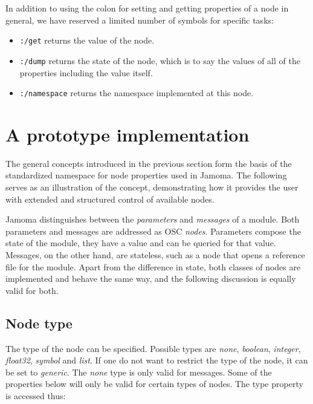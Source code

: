 \documentclass{NIME-alternate}
\begin{document}
In addition to using the colon for setting and getting properties of a node in general, we have reserved a limited number of symbols for specific tasks:
\begin{itemize}
	\item \texttt{:/get} returns the value of the node.
	\item \texttt{:/dump} returns the state of the node, which is to say the values of all of the properties including the value itself.
	\item \texttt{:/namespace} returns the namespace implemented at this node.
\end{itemize}






\section{A prototype implementation} %
\label{sec:prototype_implementation}

The general concepts introduced in the previous section form the basis of the standardized namespace for node properties used in Jamoma. The following serves as an illustration of the concept, demonstrating how it provides the user with extended and structured control of available nodes.

Jamoma distinguishes between the \emph{parameters} and \emph{messages} of a module.  Both parameters and messages are addressed as OSC \emph{nodes}.  Parameters compose the state of the module, they have a value and can be queried for that value. Messages, on the other hand, are stateless, such as a node that opens a reference file for the module. Apart from the difference in state, both classes of nodes are implemented and behave the same way, and the following discussion is equally valid for both. 



\subsection{Node type} %
\label{sub:type}

The type of the node can be specified. Possible types are \emph{none}, \emph{boolean}, \emph{integer}, \emph{float32}, \emph{symbol} and \emph{list}. If one do not want to restrict the type of the node, it can be set to \emph{generic}. The \emph{none} type is only valid for messages. Some of the properties below will only be valid for certain types of nodes. The type property is accessed thus:
\end{document}
